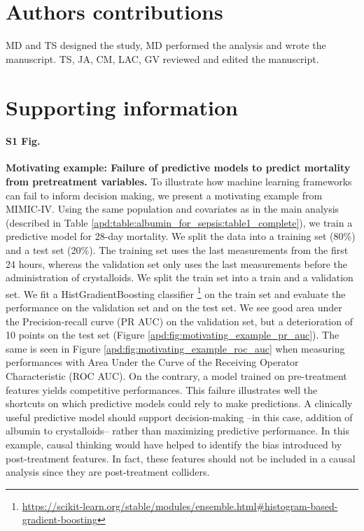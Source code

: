 \documentclass[10pt,letterpaper]{article}
\providecommand{\DIFaddbegin}{} %
\providecommand{\DIFaddend}{} %
\newcommand{\DIFaddincludegraphics}[2][]{{\color{blue}\fbox{\DIFOincludegraphics[#1]{#2}}}} %
\DeclareRobustCommand{\DIFaddbegin}{\DIFOaddbegin \let\includegraphics\DIFaddincludegraphics} %
\DeclareRobustCommand{\DIFaddend}{\DIFOaddend \let\includegraphics\DIFOincludegraphics} %
\begin{document}
\section*{Authors contributions}

MD and TS designed the study, MD performed the analysis and wrote the manuscript.
TS, JA, CM, LAC, GV reviewed and edited the manuscript.


\DIFaddbegin \clearpage
\DIFaddend

\section*{Supporting information}

\paragraph*{S1 Fig.}
\label{apd:motivating_example}
{\bf Motivating example: Failure of predictive models to predict mortality
  from pretreatment variables.}
To illustrate how machine learning frameworks can fail to inform decision
making, we present a motivating example from MIMIC-IV. Using the same
population and covariates as in the main analysis (described in Table
\ref{apd:table:albumin_for_sepsis:table1_complete}), we train a predictive
model for 28-day mortality. We split the data into a training set (80\%) and a
test set (20\%). The training set uses the last measurements from the first 24
hours, whereas the validation set only uses the last measurements before the
administration of crystalloids. We split the train set into a train and a
validation set. We fit a HistGradientBoosting classifier
\footnote{\url{https://scikit-learn.org/stable/modules/ensemble.html\#histogram-based-gradient-boosting}}
on the train set and evaluate the performance on the validation set and on the
test set. We see good area under the Precision-recall curve (PR AUC) on the
validation set, but a deterioration of 10 points on the test set (Figure
\ref{apd:fig:motivating_example_pr_auc}). The same is seen in Figure
\ref{apd:fig:motivating_example_roc_auc} when measuring performances with Area
Under the Curve of the Receiving Operator Characteristic (ROC AUC). On the
contrary, a model trained on pre-treatment features yields competitive
performances. This failure illustrates well the shortcuts on which predictive
models could rely to make predictions. A clinically useful predictive model
should support decision-making --in this case, addition of albumin to
crystalloids-- rather than maximizing predictive performance. In this example,
causal thinking would have helped to identify the bias introduced by
post-treatment features. In fact, these features should not be included in a
causal analysis since they are post-treatment colliders.
\end{document}
